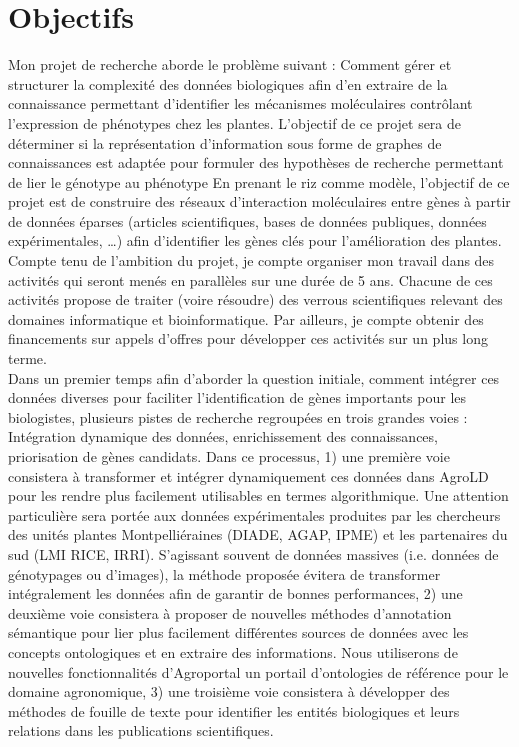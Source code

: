 \section{Objectifs}
\label{Objectifs}

Mon projet de recherche aborde le problème suivant : Comment gérer et structurer la complexité des données biologiques afin d’en extraire de la connaissance permettant d’identifier les mécanismes moléculaires contrôlant l’expression de phénotypes chez les plantes. 
L’objectif de ce projet sera de déterminer si la représentation d’information sous forme de graphes de connaissances est adaptée pour formuler des hypothèses de recherche permettant de lier le génotype au phénotype En prenant le riz comme modèle, l’objectif de ce projet est de construire des réseaux d’interaction moléculaires entre gènes à partir de données éparses (articles scientifiques, bases de données publiques, données expérimentales, …) afin d’identifier les gènes clés pour l’amélioration des plantes. Compte tenu de l’ambition du projet, je compte organiser mon travail dans des activités qui seront menés en parallèles sur une durée de 5 ans. Chacune de ces activités propose de traiter (voire résoudre) des verrous scientifiques relevant des domaines informatique et bioinformatique. Par ailleurs, je compte obtenir des financements sur appels d’offres pour développer ces activités sur un plus long terme. \\

Dans un premier temps afin d'aborder la question initiale, comment intégrer ces données diverses pour faciliter l’identification de gènes importants pour les biologistes,  plusieurs pistes de recherche regroupées en trois grandes voies : Intégration dynamique des données, enrichissement des connaissances, priorisation de gènes candidats. Dans ce processus, 1) une première voie consistera à transformer et intégrer dynamiquement ces données dans AgroLD pour les rendre plus facilement utilisables en termes algorithmique. Une attention particulière sera portée aux données expérimentales produites par les chercheurs des unités plantes Montpelliéraines (DIADE, AGAP, IPME) et les partenaires du sud (LMI RICE, IRRI). S’agissant souvent de données massives (i.e. données de génotypages ou d’images), la méthode proposée évitera de transformer intégralement les données afin de garantir de bonnes performances, 2) une deuxième voie consistera à proposer de nouvelles méthodes d’annotation sémantique pour lier plus facilement différentes sources de données avec les concepts ontologiques et en extraire des informations. Nous utiliserons de nouvelles fonctionnalités d’Agroportal un portail d'ontologies de référence pour le domaine agronomique,  3) une troisième voie consistera à développer des méthodes de fouille de texte pour identifier les entités biologiques et leurs relations dans les publications scientifiques.\\


